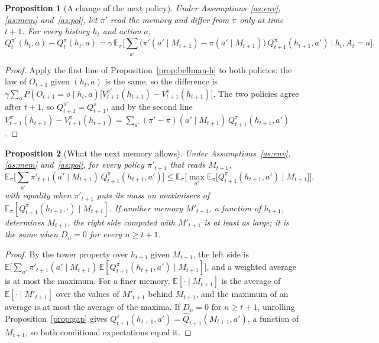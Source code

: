 \documentclass{article}
\newtheorem{proposition}{Proposition}[section]
\theoremstyle{definition}
\theoremstyle{remark}
\newcommand{\E}{\mathbb{E}}
\begin{document}
\begin{proposition}[A change of the next policy]\label{prop:later}
Under Assumptions~\ref{as:env}, \ref{as:mem} and~\ref{as:pol}, let $\pi'$ read the memory and differ from $\pi$ only at time $t+1$. For every history $h_t$ and action $a$,
\[
Q^{\pi'}_t(h_t,a)-Q^\pi_t(h_t,a)=\gamma\,\E_\pi\Big[\sum_{a'}\big(\pi'(a'\mid M_{t+1})-\pi(a'\mid M_{t+1})\big)\,Q^\pi_{t+1}(h_{t+1},a')\ \Big|\ h_t,A_t=a\Big].
\]
\end{proposition}

\begin{proof}
Apply the first line of Proposition~\ref{prop:bellman-h} to both policies: the law of $O_{t+1}$ given $(h_t,a)$ is the same, so the difference is $\gamma\sum_oP(O_{t+1}=o\mid h_t,a)\big[V^{\pi'}_{t+1}(h_{t+1})-V^\pi_{t+1}(h_{t+1})\big]$. The two policies agree after $t+1$, so $Q^{\pi'}_{t+1}=Q^\pi_{t+1}$, and by the second line $V^{\pi'}_{t+1}(h_{t+1})-V^\pi_{t+1}(h_{t+1})=\sum_{a'}(\pi'-\pi)(a'\mid M_{t+1})\,Q^\pi_{t+1}(h_{t+1},a')$.
\end{proof}

\begin{proposition}[What the next memory allows]\label{prop:ceiling}
Under Assumptions~\ref{as:env}, \ref{as:mem} and~\ref{as:pol}, for every policy $\pi'_{t+1}$ that reads $M_{t+1}$,
\[
\E_\pi\Big[\sum_{a'}\pi'_{t+1}(a'\mid M_{t+1})\,Q^\pi_{t+1}(h_{t+1},a')\Big]\le\E_\pi\Big[\max_{a'}\E_\pi\big[Q^\pi_{t+1}(h_{t+1},a')\mid M_{t+1}\big]\Big],
\]
with equality when $\pi'_{t+1}$ puts its mass on maximisers of $\E_\pi[Q^\pi_{t+1}(h_{t+1},\cdot)\mid M_{t+1}]$. If another memory $M'_{t+1}$, a function of $h_{t+1}$, determines $M_{t+1}$, the right side computed with $M'_{t+1}$ is at least as large; it is the same when $D_n=0$ for every $n\ge t+1$.
\end{proposition}

\begin{proof}
By the tower property over $h_{t+1}$ given $M_{t+1}$, the left side is $\E\big[\sum_{a'}\pi'_{t+1}(a'\mid M_{t+1})\,\E[Q^\pi_{t+1}(h_{t+1},a')\mid M_{t+1}]\big]$, and a weighted average is at most the maximum. For a finer memory, $\E[\cdot\mid M_{t+1}]$ is the average of $\E[\cdot\mid M'_{t+1}]$ over the values of $M'_{t+1}$ behind $M_{t+1}$, and the maximum of an average is at most the average of the maxima. If $D_n=0$ for $n\ge t+1$, unrolling Proposition~\ref{prop:gap} gives $Q^\pi_{t+1}(h_{t+1},a')=\hat Q_{t+1}(M_{t+1},a')$, a function of $M_{t+1}$, so both conditional expectations equal it.
\end{proof}
\end{document}
